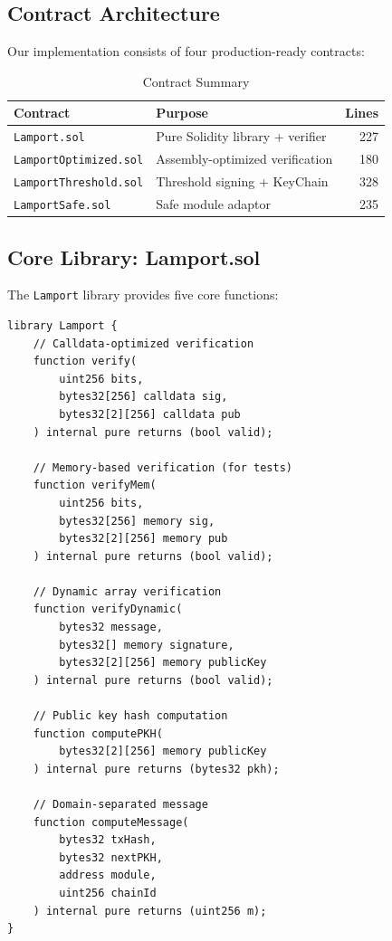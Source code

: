 \documentclass[11pt,a4paper]{article}
\begin{document}
\subsection{Contract Architecture}

Our implementation consists of four production-ready contracts:

\begin{table}[h]
\centering
\caption{Contract Summary}
\label{tab:contracts}
\begin{tabular}{@{}llr@{}}
\toprule
Contract & Purpose & Lines \\
\midrule
\texttt{Lamport.sol} & Pure Solidity library + verifier & 227 \\
\texttt{LamportOptimized.sol} & Assembly-optimized verification & 180 \\
\texttt{LamportThreshold.sol} & Threshold signing + KeyChain & 328 \\
\texttt{LamportSafe.sol} & Safe module adaptor & 235 \\
\bottomrule
\end{tabular}
\end{table}

\subsection{Core Library: Lamport.sol}

The \texttt{Lamport} library provides five core functions:

\begin{lstlisting}[language=Solidity]
library Lamport {
    // Calldata-optimized verification
    function verify(
        uint256 bits,
        bytes32[256] calldata sig,
        bytes32[2][256] calldata pub
    ) internal pure returns (bool valid);

    // Memory-based verification (for tests)
    function verifyMem(
        uint256 bits,
        bytes32[256] memory sig,
        bytes32[2][256] memory pub
    ) internal pure returns (bool valid);

    // Dynamic array verification
    function verifyDynamic(
        bytes32 message,
        bytes32[] memory signature,
        bytes32[2][256] memory publicKey
    ) internal pure returns (bool valid);

    // Public key hash computation
    function computePKH(
        bytes32[2][256] memory publicKey
    ) internal pure returns (bytes32 pkh);

    // Domain-separated message
    function computeMessage(
        bytes32 txHash,
        bytes32 nextPKH,
        address module,
        uint256 chainId
    ) internal pure returns (uint256 m);
}
\end{lstlisting}
\end{document}
